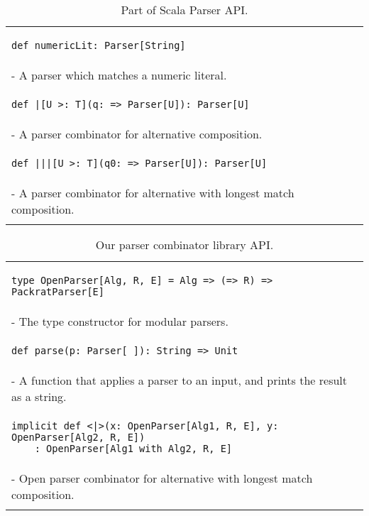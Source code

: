 \begin{table}[t]
\begin{tabular}{l}
\hline
\begin{lstlisting}
def numericLit: Parser[String]
\end{lstlisting} \\
\hspace{.2in}- A parser which matches a numeric literal. \\
\hline
\begin{lstlisting}
def |[U >: T](q: => Parser[U]): Parser[U]
\end{lstlisting} \\
\hspace{.2in}- A parser combinator for alternative composition. \\
\hline
\begin{lstlisting}
def |||[U >: T](q0: => Parser[U]): Parser[U]
\end{lstlisting} \\
\hspace{.2in}- A parser combinator for alternative with longest match composition. \\
\hline \\
\end{tabular}
\caption{Part of Scala Parser API.}\label{tab:packrat}
\end{table}

\begin{table}[t]
\begin{tabular}{l}
\hline
\begin{lstlisting}
type OpenParser[Alg, R, E] = Alg => (=> R) => PackratParser[E]
\end{lstlisting} \\
\hspace{.2in}- The type constructor for modular parsers. \\
\hline
\begin{lstlisting}
def parse(p: Parser[_]): String => Unit
\end{lstlisting} \\
\hspace{.2in}- A function that applies a parser to an input, and prints the result as a string. \\
\hline
\begin{lstlisting}
implicit def <|>(x: OpenParser[Alg1, R, E], y: OpenParser[Alg2, R, E])
    : OpenParser[Alg1 with Alg2, R, E]
\end{lstlisting} \\
\hspace{.2in}- Open parser combinator for alternative with longest match composition. \\
\hline \\
\end{tabular}
\caption{Our parser combinator library \name API.}\label{tab:parser}
\end{table}


